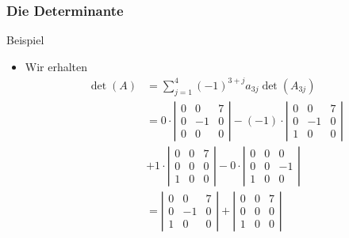 \documentclass{beamer}
\newcommand{\abs}[1]{\left|#1\right|}
\newcommand{\mytitle}{Die Determinante}
\begin{document}
\begin{frame}\frametitle{\mytitle}
	\begin{block}{Beispiel}
		\begin{itemize}
			\item Wir erhalten
				\begin{align*}
					\det(A)&=\sum_{j=1}^4(-1)^{3+j}a_{3j}\det(A_{3j})\\
						   &=0\cdot\abs{\begin{array}{ccc}0&0&7\\0&-1&0\\0&0&0\end{array}}-(-1)\cdot\abs{\begin{array}{ccc}0&0&7\\0&-1&0\\1&0&0\end{array}}\\
						&+1\cdot\abs{\begin{array}{ccc}0&0&7\\0&0&0\\1&0&0\end{array}}
						-0\cdot\abs{\begin{array}{ccc}0&0&0\\0&0&-1\\1&0&0\end{array}}\\
													   &=\abs{\begin{array}{ccc}0&0&7\\0&-1&0\\1&0&0\end{array}}+\abs{\begin{array}{ccc}0&0&7\\0&0&0\\1&0&0\end{array}}\\
				\end{align*}
		\end{itemize}
	\end{block}
\end{frame}
\end{document}
